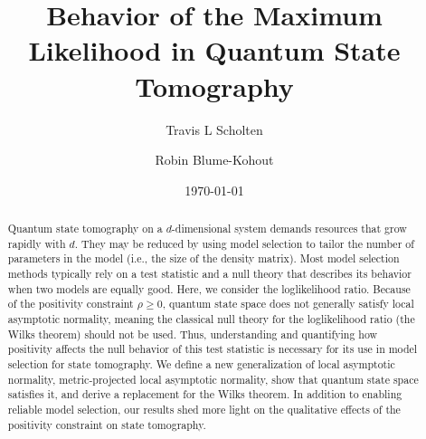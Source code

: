 \documentclass[aps,pra, twocolumn]{revtex4-1}
\begin{document}
\author{Travis L Scholten}
\author{Robin Blume-Kohout}

\title{Behavior of the Maximum Likelihood in Quantum State Tomography}

\begin{abstract}
Quantum state tomography on a $d$-dimensional system demands resources that grow rapidly with $d$. They may be reduced by using model selection to tailor the number of parameters in the model (i.e., the size of the density matrix).  Most model selection methods typically rely on a test statistic and a null theory that describes its behavior when two models are equally good. Here, we consider the loglikelihood ratio.  Because of the positivity constraint $\rho \geq 0$, quantum state space does not generally satisfy local asymptotic normality, meaning the classical null theory for the loglikelihood ratio (the Wilks theorem) should not be used.  Thus, understanding and quantifying how positivity affects the null behavior of this test statistic is necessary for its use in model selection for state tomography.  We define a new generalization of local asymptotic normality, metric-projected local asymptotic normality, show that quantum state space satisfies it, and derive a replacement for the Wilks theorem. In addition to enabling reliable model selection, our results shed more light on the qualitative effects of the positivity constraint on state tomography.
\end{abstract}
\date{\today}

\maketitle
\end{document}
